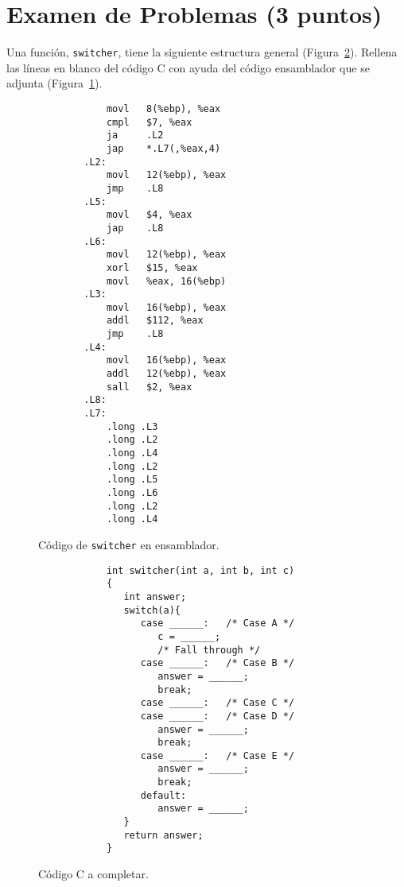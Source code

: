 \documentclass[12pt]{article}
\begin{document}
    \section*{Examen de Problemas (3 puntos)}
    \begin{ejercicio}[1 punto]
        Una función, \verb|switcher|, tiene la siguiente estructura general (Figura~\ref{fig:switcher_c}). Rellena las líneas en blanco del código C con ayuda del código ensamblador que se adjunta (Figura~\ref{fig:switcher_asm}).
        \begin{figure}[H]
        \begin{verbatim}
            movl   8(%ebp), %eax
            cmpl   $7, %eax
            ja     .L2
            jap    *.L7(,%eax,4)
        .L2:
            movl   12(%ebp), %eax
            jmp    .L8
        .L5:
            movl   $4, %eax
            jap    .L8
        .L6:
            movl   12(%ebp), %eax
            xorl   $15, %eax
            movl   %eax, 16(%ebp)
        .L3:
            movl   16(%ebp), %eax
            addl   $112, %eax
            jmp    .L8
        .L4:
            movl   16(%ebp), %eax
            addl   12(%ebp), %eax
            sall   $2, %eax
        .L8:
        .L7:
            .long .L3
            .long .L2
            .long .L4
            .long .L2
            .long .L5
            .long .L6
            .long .L2
            .long .L4
        \end{verbatim}
        \caption{Código de \texttt{switcher} en ensamblador.}
        \label{fig:switcher_asm}
        \end{figure}
        \begin{figure}[H]
        \begin{verbatim}
            int switcher(int a, int b, int c)
            {
               int answer;
               switch(a){
                  case ______:   /* Case A */
                     c = ______;
                     /* Fall through */
                  case ______:   /* Case B */
                     answer = ______;
                     break;
                  case ______:   /* Case C */
                  case ______:   /* Case D */
                     answer = ______;
                     break;
                  case ______:   /* Case E */
                     answer = ______;
                     break;
                  default:
                     answer = ______;
               }
               return answer;
            }
        \end{verbatim}
        \caption{Código C a completar.}
        \label{fig:switcher_c}
        \end{figure}
    \end{ejercicio}
\end{document}
